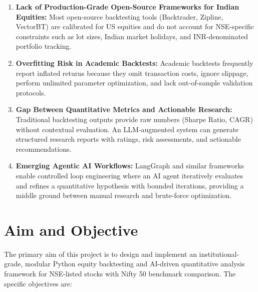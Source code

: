 \begin{enumerate}[label=\arabic*.]
    \item \textbf{Lack of Production-Grade Open-Source Frameworks for Indian Equities:} Most open-source backtesting tools (Backtrader, Zipline, VectorBT) are calibrated for US equities and do not account for NSE-specific constraints such as lot sizes, Indian market holidays, and INR-denominated portfolio tracking.
    
    \item \textbf{Overfitting Risk in Academic Backtests:} Academic backtests frequently report inflated returns because they omit transaction costs, ignore slippage, perform unlimited parameter optimization, and lack out-of-sample validation protocols.
    
    \item \textbf{Gap Between Quantitative Metrics and Actionable Research:} Traditional backtesting outputs provide raw numbers (Sharpe Ratio, CAGR) without contextual evaluation. An LLM-augmented system can generate structured research reports with ratings, risk assessments, and actionable recommendations.
    
    \item \textbf{Emerging Agentic AI Workflows:} LangGraph and similar frameworks enable controlled loop engineering where an AI agent iteratively evaluates and refines a quantitative hypothesis with bounded iterations, providing a middle ground between manual research and brute-force optimization.
\end{enumerate}

\section{Aim and Objective}

The primary aim of this project is to design and implement an institutional-grade, modular Python equity backtesting and AI-driven quantitative analysis framework for NSE-listed stocks with Nifty 50 benchmark comparison. The specific objectives are:

